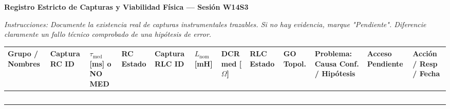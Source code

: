 \documentclass[11pt, a4paper, landscape]{article}
\begin{document}
\begin{tcolorbox}[colback=ucbblue!5!white, colframe=ucbblue, title=\textbf{Artefacto A1: Matriz de Evidencia y Diagnóstico Operativo (EC3)}]
    \centering \textbf{Registro Estricto de Capturas y Viabilidad Física — Sesión W14S3}
\end{tcolorbox}

\noindent\textit{Instrucciones: Documente la existencia real de capturas instrumentales trazables. Si no hay evidencia, marque "Pendiente". Diferencie claramente un fallo técnico comprobado de una hipótesis de error.}

\vspace{0.3cm}
{\small
\setlength{\tabcolsep}{3pt}
\renewcommand{\arraystretch}{1.5}
\noindent
\begin{tabularx}{\textwidth}{
  >{\bfseries\RaggedRight\hsize=0.6\hsize}X 
  >{\RaggedRight\arraybackslash\hsize=0.8\hsize}X 
  >{\centering\arraybackslash\hsize=0.6\hsize}X 
  >{\centering\arraybackslash\hsize=0.7\hsize}X 
  >{\RaggedRight\arraybackslash\hsize=0.8\hsize}X 
  >{\centering\arraybackslash\hsize=0.6\hsize}X 
  >{\centering\arraybackslash\hsize=0.6\hsize}X 
  >{\centering\arraybackslash\hsize=0.7\hsize}X 
  >{\centering\arraybackslash\hsize=0.5\hsize}X 
  >{\RaggedRight\arraybackslash\hsize=1.2\hsize}X 
  >{\centering\arraybackslash\hsize=0.7\hsize}X 
  >{\RaggedRight\arraybackslash\hsize=1.2\hsize}X}
\toprule
\textbf{Grupo / Nombres} & \textbf{Captura RC ID} & \textbf{$\tau_{\text{med}}$ [ms] o NO MED} & \textbf{RC Estado} & \textbf{Captura RLC ID} & \textbf{$L_{\text{nom}}$ [mH]} & \textbf{DCR med [$\Omega$]} & \textbf{RLC Estado} & \textbf{GO Topol.} & \textbf{Problema: Causa Conf. / Hipótesis} & \textbf{Acceso Pendiente} & \textbf{Acción / Resp / Fecha} \\
\midrule
 & & & & & & & & & & & \\ \addlinespace
 & & & & & & & & & & & \\ \addlinespace
 & & & & & & & & & & & \\ \addlinespace
 & & & & & & & & & & & \\ \addlinespace
 & & & & & & & & & & & \\ 
\bottomrule
\end{tabularx}
}
\end{document}
